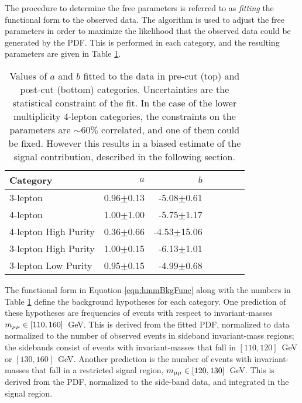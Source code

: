 The procedure to determine the free parameters is referred to as \emph{fitting} the functional form to the observed data.
The  algorithm \cite{roofit} is used to adjust the free parameters in order to maximize the likelihood that the observed data could be generated by the PDF.
This is performed in each category, and the resulting parameters are given in Table \ref{tab:hmmBkgFitParams}.

\begin{table}[htp]
\caption{Values of $a$ and $b$ fitted to the data in pre-cut (top) and post-cut (bottom) categories. Uncertainties are the statistical constraint of the fit. In the case of the lower multiplicity 4-lepton categories, the constraints on the parameters are $\sim60\%$ correlated, and one of them could be fixed. However this results in a biased estimate of the signal contribution, described in the following section.}
\begin{center}
\begin{tabular}{l r r r r r r}
\toprule
Category & $a$ & $b$ \\
\midrule
3-lepton & 0.96$\pm$0.13 & -5.08$\pm$0.61 \\
4-lepton & 1.00$\pm$1.00 & -5.75$\pm$1.17 \\
\midrule
4-lepton High Purity & 0.36$\pm$0.66 & -4.53$\pm$15.06 \\
3-lepton High Purity & 1.00$\pm$0.15 & -6.13$\pm$1.01 \\
3-lepton Low Purity  & 0.95$\pm$0.15 & -4.99$\pm$0.68 \\
\bottomrule
\end{tabular}
\label{tab:hmmBkgFitParams}
\end{center}
\end{table}

The functional form in Equation \ref{eqn:hmmBkgFunc} along with the numbers in Table \ref{tab:hmmBkgFitParams} define the background hypotheses for each category.
One prediction of these hypotheses are frequencies of events with respect to invariant-masses $m_{\mu\mu}\in[110,160]$~GeV.
This is derived from the fitted PDF, normalized to data normalized to the number of observed events in sideband invariant-mass regions; the sidebands consist of events with invariant-masses that fall in $[110,120]$~GeV or $[130,160]$~GeV.
Another prediction is the number of events with invariant-masses that fall in a restricted signal region, $m_{\mu\mu}\in[120,130]$~GeV.
This is derived from the PDF, normalized to the side-band data, and integrated in the signal region.
